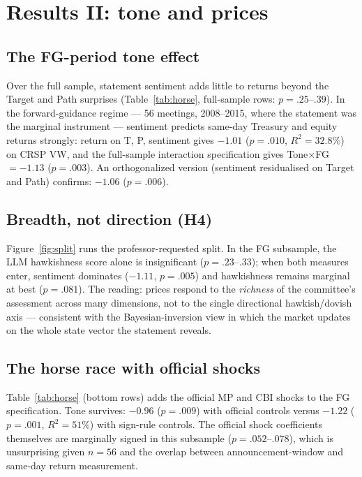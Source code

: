 \documentclass[11pt]{article}
\begin{document}
\section{Results II: tone and prices}\label{sec:prices}

\subsection{The FG-period tone effect}\label{sec:fgtone}

Over the full sample, statement sentiment adds little to returns beyond the
Target and Path surprises (Table~\ref{tab:horse}, full-sample rows:
$p=.25$--$.39$). In the forward-guidance regime --- 56 meetings, 2008--2015,
where the statement was the marginal instrument --- sentiment predicts
same-day Treasury and equity returns strongly: return on T, P, sentiment
gives $-1.01$ ($p=.010$, $R^2=32.8\%$) on CRSP VW, and the full-sample
interaction specification gives Tone$\times$FG $=-1.13$ ($p=.003$). An
orthogonalized version (sentiment residualised on Target and Path)
confirms: $-1.06$ ($p=.006$).

\subsection{Breadth, not direction (H4)}\label{sec:split}

Figure~\ref{fig:split} runs the professor-requested split. In the FG
subsample, the LLM hawkishness score alone is insignificant
($p=.23$--$.33$); when both measures enter, sentiment dominates
($-1.11$, $p=.005$) and hawkishness remains marginal at best ($p=.081$).
The reading: prices respond to the \emph{richness} of the committee's
assessment across many dimensions, not to the single directional
hawkish/dovish axis --- consistent with the Bayesian-inversion view in which
the market updates on the whole state vector the statement reveals.

\subsection{The horse race with official shocks}\label{sec:horserace}

Table~\ref{tab:horse} (bottom rows) adds the official MP and CBI shocks to
the FG specification. Tone survives: $-0.96$ ($p=.009$) with official controls
versus $-1.22$ ($p=.001$, $R^2=51\%$) with sign-rule controls. The official shock
coefficients themselves are marginally signed in this subsample
($p=.052$--$.078$), which is unsurprising given $n=56$ and the overlap between
announcement-window and same-day return measurement.
\end{document}
